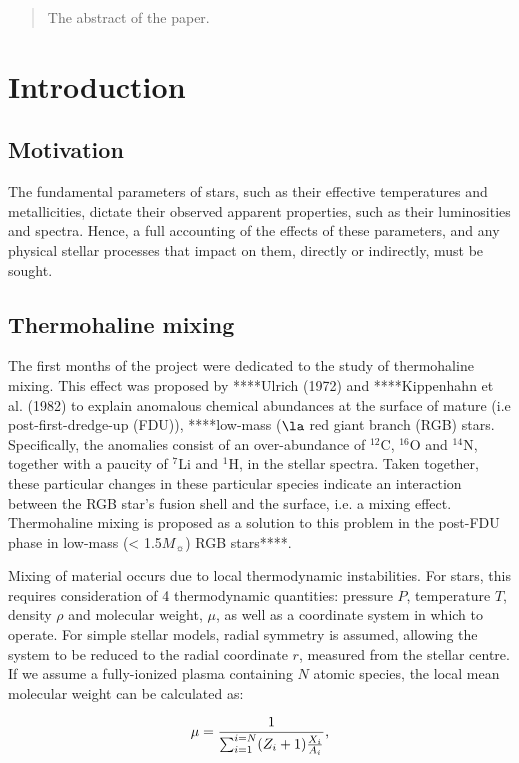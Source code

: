 \documentclass[usenatbib]{mnras}
\begin{document}
\begin{abstract}
The abstract of the paper.
\end{abstract}

\section{Introduction}
\subsection{Motivation}
The fundamental parameters of stars, such as their effective temperatures and metallicities, dictate their observed apparent properties, such as their luminosities and spectra. Hence, a full accounting of the effects of these parameters, and any physical stellar processes that impact on them, directly or indirectly, must be sought.

\subsection{Thermohaline mixing}
The first months of the project were dedicated to the study of thermohaline mixing. This effect was proposed by ****Ulrich (1972) and ****Kippenhahn et al. (1982) to explain anomalous chemical abundances at the surface of mature (i.e post-first-dredge-up (FDU)), ****low-mass ($\la$ red giant branch (RGB) stars. Specifically, the anomalies consist of an over-abundance of $^{12}$C, $^{16}$O and $^{14}$N, together with a paucity of $^{7}$Li and $^{1}$H, in the stellar spectra. Taken together, these particular changes in these particular species indicate an interaction between the RGB star's fusion shell and the surface, i.e. a mixing effect. Thermohaline mixing is proposed as a solution to this problem in the post-FDU phase in low-mass (< 1.5$M_{\sun}$) RGB stars****.

Mixing of material occurs due to local thermodynamic instabilities. For stars, this requires consideration of 4 thermodynamic quantities: pressure $P$, temperature $T$, density $\rho$ and molecular weight, $\mu$, as well as a coordinate system in which to operate. For simple stellar models, radial symmetry is assumed, allowing the system to be reduced to the radial coordinate $r$, measured from the stellar centre. If we assume a fully-ionized plasma containing $N$ atomic species, the local mean molecular weight can be calculated as:

\begin{equation}
\mu = \frac{1}{\sum_{i=1}^{i=N} (Z_{i}+1) \frac{X_{i}}{A_{i}}} \textnormal{,}
\label{mol_weight_def}
\end{equation}
\end{document}
